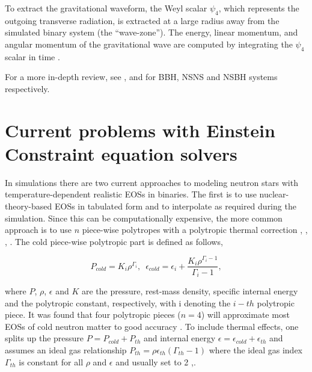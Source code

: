 To extract the gravitational waveform, the Weyl scalar $\psi_{4}$, which represents the outgoing transverse radiation, is extracted at a large radius away from the simulated binary system (the ``wave-zone''). The energy, linear momentum, and angular momentum of the gravitational wave are computed by integrating the $\psi_{4}$ scalar in time \cite{kyutoku2015dynamical}.

For a more in-depth review, see \cite{sperhake2014numerical}, \cite{faber2012binary} and \cite{shibata2011coalescence} for BBH, NSNS and NSBH systems respectively.

\section{Current problems with Einstein Constraint equation solvers}

In simulations there are two current approaches to modeling neutron stars with temperature-dependent realistic EOSs in binaries. The first is to use nuclear-theory-based EOSs in tabulated form \cite{composewebsite} and to interpolate as required during the simulation. Since this can be computationally expensive, the more common approach is to use $n$ piece-wise polytropes with a polytropic thermal correction \cite{deaton2013black}, \cite{kyutoku2013black}, \cite{bauswein2014revealing}, \cite{kyutoku2015dynamical}. The cold piece-wise polytropic part is defined as follows,

\begin{equation}
\label{eq:7}
P_{cold} = K_i\rho^{\Gamma_i},\,\,\, \epsilon_{cold} = \epsilon_i + \frac{K_{i}\rho^{\Gamma_{i}-1}}{\Gamma_{i}-1},
\end{equation}

where $P$, $\rho$, $\epsilon$ and $K$ are the pressure, rest-mass density, specific internal energy and the polytropic constant, respectively, with i denoting the $i-th$ polytropic piece. It was found that four polytropic pieces ($n=4$) will approximate most EOSs of cold neutron matter to good accuracy \cite{read2008neutron}. To include thermal effects, one splits up the pressure $P = P_{cold} + P_{th}$ and internal energy $\epsilon = \epsilon_{cold}+\epsilon_{th}$ and assumes an ideal gas relationship $P_{th} = \rho \epsilon_{th}(\Gamma_{th}-1)$ where the ideal gas index $\Gamma_{th}$ is constant for all $\rho$ and $\epsilon$ and usually set to 2 \cite{bauswein2010testing},\cite{takami2014constraining}.



